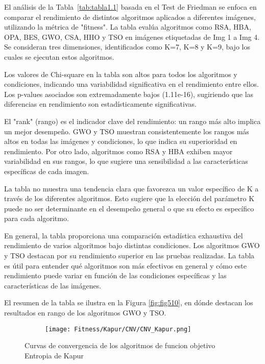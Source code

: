\documentclass[conference]{IEEEtran}
\begin{document}
\noindent El análisis de la Tabla~\ref{tab:tabla1.1} basada en el Test de Friedman se enfoca en comparar el rendimiento de distintos algoritmos aplicados a diferentes imágenes, utilizando la métrica de "fitness". La tabla evalúa algoritmos como RSA, HBA, OPA, BES, GWO, CSA, HHO y TSO en imágenes etiquetadas de Img 1 a Img 4. Se consideran tres dimensiones, identificados como K=7, K=8 y K=9, bajo los cuales se ejecutan estos algoritmos.

\noindent Los valores de Chi-square en la tabla son altos para todos los algoritmos y condiciones, indicando una variabilidad significativa en el rendimiento entre ellos. Los p-values asociados son extremadamente bajos (1.11e-16), sugiriendo que las diferencias en rendimiento son estadísticamente significativas.

\noindent El "rank" (rango) es el indicador clave del rendimiento: un rango más alto implica un mejor desempeño. GWO y TSO muestran consistentemente los rangos más altos en todas las imágenes y condiciones, lo que indica su superioridad en rendimiento. Por otro lado, algoritmos como RSA y HBA exhiben mayor variabilidad en sus rangos, lo que sugiere una sensibilidad a las características específicas de cada imagen.

\noindent La tabla no muestra una tendencia clara que favorezca un valor específico de K a través de los diferentes algoritmos. Esto sugiere que la elección del parámetro K puede no ser determinante en el desempeño general o que su efecto es específico para cada algoritmo.

\noindent En general, la tabla proporciona una comparación estadística exhaustiva del rendimiento de varios algoritmos bajo distintas condiciones. Los algoritmos GWO y TSO destacan por su rendimiento superior en las pruebas realizadas. La tabla es útil para entender qué algoritmos son más efectivos en general y cómo este rendimiento puede variar en función de las condiciones específicas y las características de las imágenes.

\noindent El resumen de la tabla se ilustra en la Figura \ref{fig:fig510}, en dónde destacan los resultados en rango de los algoritmos GWO y TSO.



\begin{figure}
	\centering
	\begin{subfigure}{0.5\textwidth}
		\texttt{[image: Fitness/Kapur/CNV/CNV\_Kapur.png]}
	\end{subfigure}
	\caption{Curvas de convergencia de los algoritmos de funcion objetivo Entropia de Kapur}
	\label{fig:imagenes}    
\end{figure}
\end{document}
